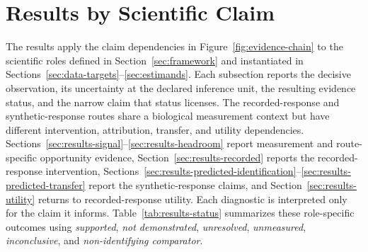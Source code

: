 \section{Results by Scientific Claim}
\label{sec:results}

The results apply the claim dependencies in Figure~\ref{fig:evidence-chain} to the scientific roles defined in Section~\ref{sec:framework} and instantiated in Sections~\ref{sec:data-targets}--\ref{sec:estimands}.
Each subsection reports the decisive observation, its uncertainty at the declared inference unit, the resulting evidence status, and the narrow claim that status licenses.
The recorded-response and synthetic-response routes share a biological measurement context but have different intervention, attribution, transfer, and utility dependencies.
Sections~\ref{sec:results-signal}--\ref{sec:results-headroom} report measurement and route-specific opportunity evidence, Section~\ref{sec:results-recorded} reports the recorded-response intervention, Sections~\ref{sec:results-predicted-identification}--\ref{sec:results-predicted-transfer} report the synthetic-response claims, and Section~\ref{sec:results-utility} returns to recorded-response utility.
Each diagnostic is interpreted only for the claim it informs.
Table~\ref{tab:results-status} summarizes these role-specific outcomes using \emph{supported}, \emph{not demonstrated}, \emph{unresolved}, \emph{unmeasured}, \emph{inconclusive}, and \emph{non-identifying comparator}.

